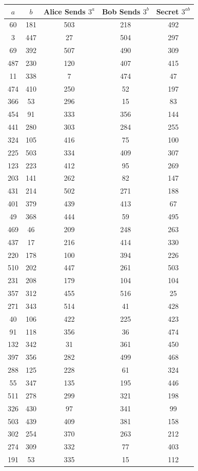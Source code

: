 \documentclass[12pt]{article}
\begin{document}
\begin{enumerate}
\begin{enumerate}
\begin{tabular}{|c|c|c|c|c|}
\hline
$a$ & $b$ & Alice Sends $3^a$ & Bob Sends $3^b$ & Secret $3^{ab}$ \\
\hline
60 & 181 & 503 & 218 & 492 \\
3 & 447 & 27 & 504 & 297 \\
69 & 392 & 507 & 490 & 309 \\
487 & 230 & 120 & 407 & 415 \\
11 & 338 & 7 & 474 & 47 \\
474 & 410 & 250 & 52 & 197 \\
366 & 53 & 296 & 15 & 83 \\
454 & 91 & 333 & 356 & 144 \\
441 & 280 & 303 & 284 & 255 \\
324 & 105 & 416 & 75 & 100 \\
225 & 503 & 334 & 409 & 307 \\
123 & 223 & 412 & 95 & 269 \\
203 & 141 & 262 & 82 & 147 \\
431 & 214 & 502 & 271 & 188 \\
401 & 379 & 439 & 413 & 67 \\
49 & 368 & 444 & 59 & 495 \\
469 & 46 & 209 & 248 & 263 \\
437 & 17 & 216 & 414 & 330 \\
220 & 178 & 100 & 394 & 226 \\
510 & 202 & 447 & 261 & 503 \\
231 & 208 & 179 & 104 & 104 \\
357 & 312 & 455 & 516 & 25 \\
271 & 343 & 514 & 41 & 428 \\
40 & 106 & 422 & 225 & 423 \\
91 & 118 & 356 & 36 & 474 \\
132 & 342 & 31 & 361 & 450 \\
397 & 356 & 282 & 499 & 468 \\
288 & 125 & 228 & 61 & 324 \\
55 & 347 & 135 & 195 & 446 \\
511 & 278 & 299 & 321 & 198 \\
326 & 430 & 97 & 341 & 99 \\
503 & 439 & 409 & 381 & 158 \\
302 & 254 & 370 & 263 & 212 \\
274 & 309 & 332 & 77 & 403 \\
191 & 53 & 335 & 15 & 112 \\

\end{tabular}
\end{enumerate}
\end{enumerate}
\end{document}
